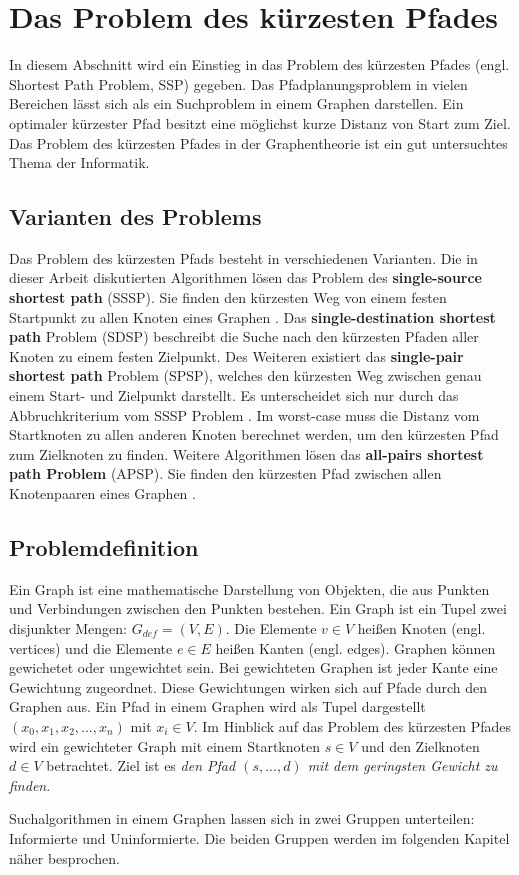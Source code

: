 \chapter{Das Problem des kürzesten Pfades}

In diesem Abschnitt wird ein Einstieg in das Problem des kürzesten Pfades (engl. Shortest Path Problem, SSP) gegeben. Das Pfadplanungsproblem in vielen Bereichen lässt sich als ein Suchproblem in einem Graphen darstellen\cite{HartNilssonandRaphael.1968}. Ein optimaler kürzester Pfad besitzt eine möglichst kurze Distanz von Start zum Ziel. Das Problem des kürzesten Pfades in der Graphentheorie ist ein gut untersuchtes Thema der Informatik\cite[S.1]{Madkour.2017}.


\section{Varianten des Problems}

Das Problem des kürzesten Pfads besteht in verschiedenen Varianten. Die in dieser Arbeit diskutierten Algorithmen lösen das Problem des \textbf{single-source shortest path} (SSSP). Sie finden den kürzesten Weg von einem festen Startpunkt zu allen Knoten eines Graphen \cite{GYT18}. %
Das \textbf{single-destination shortest path} Problem (SDSP)  beschreibt die Suche nach den kürzesten Pfaden aller Knoten zu einem festen Zielpunkt. Des Weiteren existiert das \textbf{single-pair shortest path} Problem (SPSP), welches den kürzesten Weg zwischen genau einem Start- und Zielpunkt darstellt. Es unterscheidet sich nur durch das Abbruchkriterium vom SSSP Problem \cite{Ottmann.2017}. Im worst-case muss die Distanz vom Startknoten zu allen anderen Knoten berechnet werden, um den kürzesten Pfad zum Zielknoten zu finden. Weitere Algorithmen lösen das \textbf{all-pairs shortest path Problem} (APSP). Sie finden den kürzesten Pfad zwischen allen Knotenpaaren eines Graphen \cite[S.644]{Cormen.2009}.


\section{Problemdefinition}

Ein Graph ist eine mathematische Darstellung von Objekten, die aus Punkten und Verbindungen zwischen den Punkten bestehen. Ein Graph ist ein Tupel zwei disjunkter Mengen: $G_{def}= (V,E)$. Die Elemente $v \in V$ heißen Knoten (engl. vertices) und die Elemente $e \in E$ heißen Kanten (engl. edges). Graphen können gewichetet oder ungewichtet sein. Bei gewichteten Graphen ist jeder Kante eine Gewichtung zugeordnet. Diese Gewichtungen wirken sich auf Pfade durch den Graphen aus\cite{Gross.2004}. Ein Pfad in einem Graphen wird als Tupel dargestellt $\left ( x_{0}, x_{1}, x_{2}, ..., x_{n} \right )$ mit $x_{i} \in V$.  Im Hinblick auf das Problem des kürzesten Pfades wird ein gewichteter Graph mit einem Startknoten $s \in V$ und den Zielknoten $d \in V$ betrachtet. Ziel ist es \textit{den Pfad  $\left ( s, ..., d \right )$ mit dem geringsten Gewicht zu finden}\cite[S.4]{Madkour.2017}.



Suchalgorithmen in einem Graphen lassen sich in zwei Gruppen unterteilen:
Informierte und Uninformierte. Die beiden Gruppen werden im folgenden Kapitel
näher besprochen.

